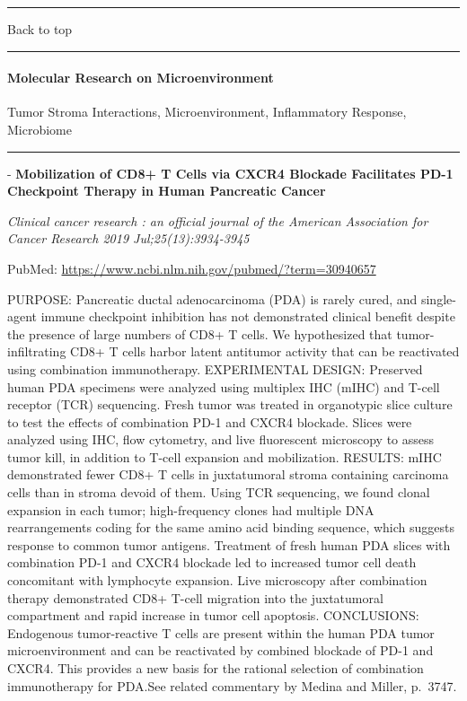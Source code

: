 \documentclass[]{article}
\let\oldparagraph\paragraph
\renewcommand{\paragraph}[1]{\oldparagraph{#1}\mbox{}}
\begin{document}
{}

{}

\begin{center}\rule{0.5\linewidth}{\linethickness}\end{center}

Back to top

\begin{center}\rule{0.5\linewidth}{\linethickness}\end{center}

\pagebreak

\hypertarget{molecular-research-on-microenvironment}{%
\paragraph{Molecular Research on
Microenvironment}\label{molecular-research-on-microenvironment}}

Tumor Stroma Interactions, Microenvironment, Inflammatory Response,
Microbiome

\begin{center}\rule{0.5\linewidth}{\linethickness}\end{center}

 - \textbf{Mobilization of CD8+ T Cells via CXCR4 Blockade Facilitates
PD-1 Checkpoint Therapy in Human Pancreatic Cancer}

\emph{Clinical cancer research : an official journal of the American
Association for Cancer Research 2019 Jul;25(13):3934-3945}

PubMed: \url{https://www.ncbi.nlm.nih.gov/pubmed/?term=30940657}

PURPOSE: Pancreatic ductal adenocarcinoma (PDA) is rarely cured, and
single-agent immune checkpoint inhibition has not demonstrated clinical
benefit despite the presence of large numbers of CD8+ T cells. We
hypothesized that tumor-infiltrating CD8+ T cells harbor latent
antitumor activity that can be reactivated using combination
immunotherapy. EXPERIMENTAL DESIGN: Preserved human PDA specimens were
analyzed using multiplex IHC (mIHC) and T-cell receptor (TCR)
sequencing. Fresh tumor was treated in organotypic slice culture to test
the effects of combination PD-1 and CXCR4 blockade. Slices were analyzed
using IHC, flow cytometry, and live fluorescent microscopy to assess
tumor kill, in addition to T-cell expansion and mobilization. RESULTS:
mIHC demonstrated fewer CD8+ T cells in juxtatumoral stroma containing
carcinoma cells than in stroma devoid of them. Using TCR sequencing, we
found clonal expansion in each tumor; high-frequency clones had multiple
DNA rearrangements coding for the same amino acid binding sequence,
which suggests response to common tumor antigens. Treatment of fresh
human PDA slices with combination PD-1 and CXCR4 blockade led to
increased tumor cell death concomitant with lymphocyte expansion. Live
microscopy after combination therapy demonstrated CD8+ T-cell migration
into the juxtatumoral compartment and rapid increase in tumor cell
apoptosis. CONCLUSIONS: Endogenous tumor-reactive T cells are present
within the human PDA tumor microenvironment and can be reactivated by
combined blockade of PD-1 and CXCR4. This provides a new basis for the
rational selection of combination immunotherapy for PDA.See related
commentary by Medina and Miller, p.~3747.
\end{document}

